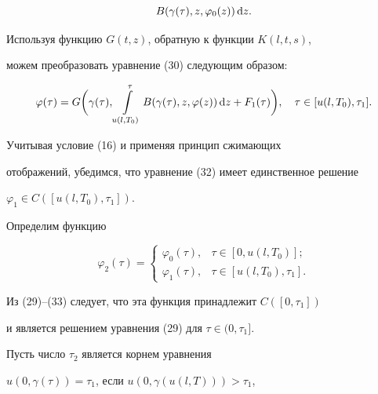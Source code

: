 \begin{pf}
\begin{equation}
B(\gamma (\tau ),z,\varphi_0 (z))\d z.




\end{equation}


Используя функцию $G(t,z)$, обратную к функции $K(l,t,s)$,


можем преобразовать уравнение (30) следующим образом:


\begin{equation}


\varphi (\tau )=G\bigg(\gamma (\tau


),\int\limits_{u(l,T_0)}^\tau


B(\gamma (\tau ),z,\varphi (z))\d z+F_1(\tau)\bigg),


\q \tau \in [u(l,T_0),\tau_1].




\end{equation}


Учитывая условие (16) и применяя принцип сжимающих


отображений, убедимся, что уравнение (32) имеет единственное решение


$\varphi_1 \in C([u(l,T_0),\tau_1])$.





Определим функцию


\begin{equation}


\varphi_2 (\tau) =


\begin{cases}


\varphi_0 (\tau), & \tau \in [0,u(l,T_0)];\\


\varphi_1 (\tau), & \tau \in [u(l,T_0),\tau_1].


\end{cases}




\end{equation}


Из (29)--(33) следует, что эта функция принадлежит $C([0,\tau_1])$


и является решением уравнения (29) для $\tau\in(0,\tau_1]$.





Пусть число $\tau_2$ является корнем уравнения


$u(0,\gamma (\tau ))=\tau_1$, если $u(0,\gamma (u(l,T)))>\tau_1$,



\end{pf}
